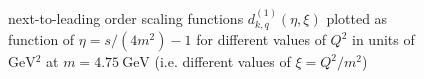 \pagebreak
\begin{figure}[ht!]
\centering
\begin{subfigure}[t]{\textwidth}
	
\end{subfigure}\\%
\begin{subfigure}[t]{\textwidth}
	
\end{subfigure}\\%
\begin{subfigure}[t]{\textwidth}
	
\end{subfigure}
\caption{next-to-leading order scaling functions $d_{k,q}^{(1)}(\eta,\xi)$ plotted as function of $\eta=s/(4m^2)-1$ for different values of $Q^2$ in units of $\si{\GeV^2}$ at $m=\SI{4.75}{\GeV}$ (i.e. different values of $\xi=Q^2/m^2$) }\label{fig:dq1}
\end{figure}

\clearpage
\pagebreak
